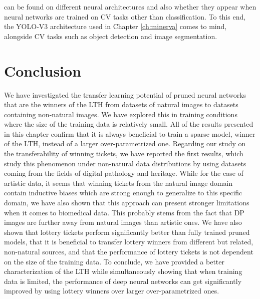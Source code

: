 can be found on different neural architectures and also whether they appear when neural networks are trained on CV tasks other than classification. To this end, the YOLO-V3 architecture used in Chapter \ref{ch:minerva} comes to mind, alongside CV tasks such as object detection and image segmentation.

\section{Conclusion}
\label{sec:conclusion}
We have investigated the transfer learning potential of pruned neural networks that are the winners of the LTH from datasets of natural images to datasets containing non-natural images. We have explored this in training conditions where the size of the training data is relatively small. All of the results presented in this chapter confirm that it is always beneficial to train a sparse model, winner of the LTH, instead of a larger over-parametrized one. Regarding our study on the transferability of winning tickets, we have reported the first results, which study this phenomenon under non-natural data distributions by using datasets coming from the fields of digital pathology and heritage. While for the case of artistic data, it seems that winning tickets from the natural image domain contain inductive biases which are strong enough to generalize to this specific domain, we have also shown that this approach can present stronger limitations when it comes to biomedical data. This probably stems from the fact that DP images are further away from natural images than artistic ones. We have also shown that lottery tickets perform significantly better than fully trained pruned models, that it is beneficial to transfer lottery winners from different but related, non-natural sources, and that the performance of lottery tickets is not dependent on the size of the training data. To conclude, we have provided a better characterization of the LTH while simultaneously showing that when training data is limited, the performance of deep neural networks can get significantly improved by using lottery winners over larger over-parametrized ones.

\clearpage


